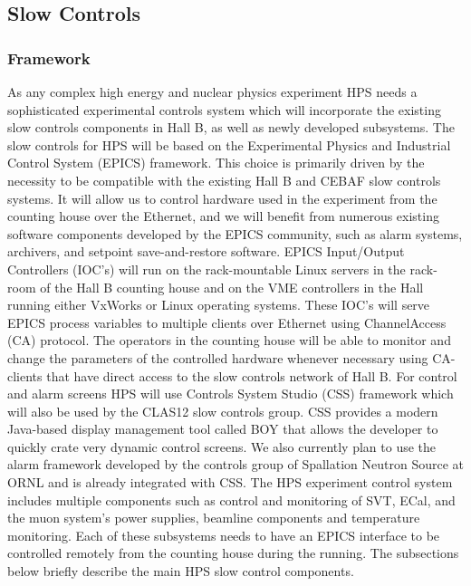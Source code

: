 
\subsection{Slow Controls}

\subsubsection{Framework}
\label{sec:ctrls:framework}
As any complex high energy and nuclear physics experiment HPS needs a sophisticated experimental controls 
system which will incorporate the existing slow controls components in Hall B, as well as 
newly developed subsystems.  The slow controls for HPS  will be based on the 
Experimental Physics and Industrial Control System (EPICS) framework. This choice is primarily 
driven by the necessity to be compatible with the existing Hall B and CEBAF slow controls systems. 
It will allow us to control  hardware used in the experiment from the counting house 
over the Ethernet, and we will benefit from numerous existing software components developed by the EPICS 
community, such as alarm systems, archivers, and setpoint save-and-restore software. EPICS Input/Output 
Controllers (IOC's)  will run on the rack-mountable 
Linux servers in the rack-room of the Hall B counting house and on the VME controllers in the Hall 
running either VxWorks or Linux operating systems. These IOC's will serve EPICS process variables 
to multiple clients over Ethernet using ChannelAccess (CA) protocol. The operators in the counting house 
will be able to monitor and change the parameters of the controlled hardware whenever necessary using 
CA-clients that have direct access to the slow controls network of Hall B.  
For control and alarm screens HPS will use Controls System Studio (CSS) framework which will also be  
used by the CLAS12 slow controls group. CSS provides a modern Java-based display management tool called 
BOY that allows the developer to quickly crate very dynamic control screens. We also currently plan to use 
the alarm framework developed by the controls group of Spallation Neutron Source at ORNL and is already integrated 
with CSS. The HPS experiment control system includes multiple components such as control and monitoring of  SVT, 
ECal, and the muon system's power supplies, beamline components and temperature monitoring. Each of 
these subsystems needs to have an EPICS interface to be controlled remotely from the counting house during 
the running. The subsections below briefly describe the main HPS slow control components. 


